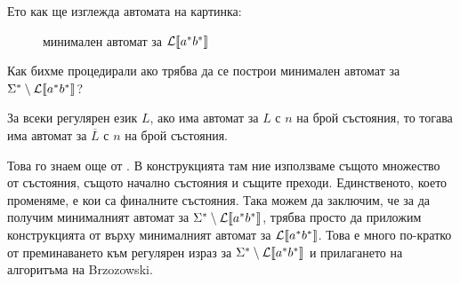Ето как ще изглежда автомата на картинка:
\begin{figure}[h]
    \centering
    \caption*{минимален автомат за $\mathcal{L}\llbracket a^*b^* \rrbracket$}
\end{figure}

Как бихме процедирали ако трябва да се построи минимален автомат за $\Sigma^* \setminus \mathcal{L}\llbracket a^*b^* \rrbracket$?

\begin{warning}
    За всеки регулярен език $L$, ако има автомат за $L$ с $n$ на брой състояния, то тогава има автомат за $\overline{L}$ с $n$ на брой състояния.
\end{warning}

Това го знаем още от .
В конструкцията там ние използваме същото множество от състояния, същото начално състояния и същите преходи.
Единственото, което променяме, е кои са финалните състояния.
Така можем да заключим, че за да получим минималният автомат за $\Sigma^* \setminus \mathcal{L}\llbracket a^*b^* \rrbracket$, трябва просто да приложим конструкцията от  върху минималният автомат за $\mathcal{L}\llbracket a^*b^* \rrbracket$.
Това е много по-кратко от преминаването към регулярен израз за $\Sigma^* \setminus \mathcal{L}\llbracket a^*b^* \rrbracket$ и прилагането на алгоритъма на Brzozowski.